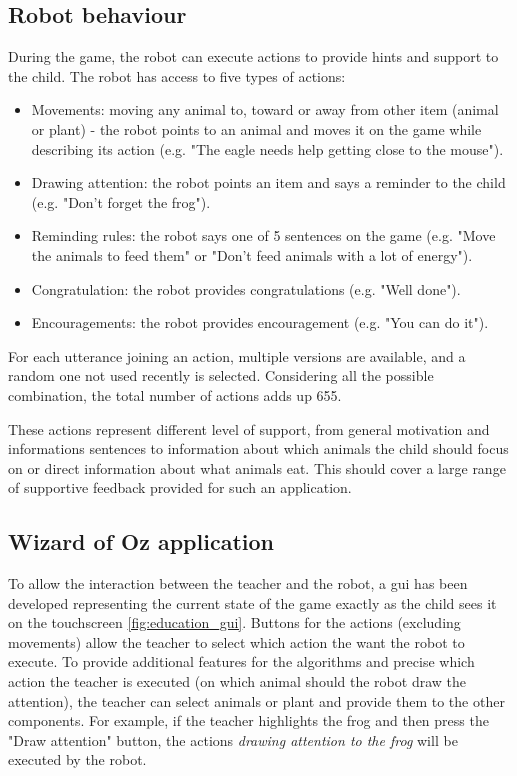 \subsection{Robot behaviour}
 
During the game, the robot can execute actions to provide hints and support to the child. The robot has access to five types of actions:
\begin{itemize}
	\item Movements: moving any animal to, toward or away from other item (animal or plant) - the robot points to an animal and moves it on the game while describing its action (e.g. "The eagle needs help getting close to the mouse").
	\item Drawing attention: the robot points an item and says a reminder to the child (e.g. "Don't forget the frog").
	\item Reminding rules: the robot says one of 5 sentences on the game (e.g. "Move the animals to feed them" or "Don't feed animals with a lot of energy").
	\item Congratulation: the robot provides congratulations (e.g. "Well done").
	\item Encouragements: the robot provides encouragement (e.g. "You can do it").
\end{itemize}

For each utterance joining an action, multiple versions are available, and a random one not used recently is selected. Considering all the possible combination, the total number of  actions adds up 655.

These actions represent different level of support, from general motivation and informations sentences to information about which animals the child should focus on or direct information about what animals eat. This should cover a large range of supportive feedback provided for such an application. 

\subsection{Wizard of Oz application}

To allow the interaction between the teacher and the robot, a \gls{gui} has been developed representing the current state of the game exactly as the child sees it on the touchscreen \ref{fig:education_gui}. Buttons for the actions (excluding movements) allow the teacher to select which action the want the robot to execute. To provide additional features for the algorithms and precise which action the teacher is executed (on which animal should the robot draw the attention), the teacher can select animals or plant and provide them to the other components. For example, if the teacher highlights the frog and then press the "Draw attention" button, the actions \textit{drawing attention to the frog} will be executed by the robot.


